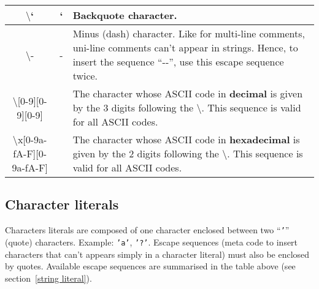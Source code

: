 \begin{tabular}{|c|c|p{7cm}|}
  \hline
  $\setminus$` & `      & Backquote character. \\
  \hline
  $\setminus$\-- & \-- & Minus (dash) character. Like for multi-line
                           comments, uni-line comments can't appear in
                           strings. Hence, to insert the sequence
                           ``\--\--'', use this escape sequence twice. \\
  \hline
  $\setminus$[0-9][0-9][0-9] & & The character whose ASCII code in
                                {\bf decimal} is given by the 3 digits
                                following the $\setminus$. This
                                sequence is valid for all
                                ASCII codes. \\
  \hline
  $\setminus$x[0-9a-fA-F][0-9a-fA-F] & & The character whose ASCII code in
                                {\bf hexadecimal} is given by the 2
                                digits following the $\setminus$. This
                                sequence is valid for all
                                ASCII codes.\\
  \hline
\end{tabular}



\subsection{Character literals}
\label{character literals}
\label{hexadecimal}
Characters literals are composed of one character enclosed between two
``{\tt '}'' (quote) characters. Example: {\tt 'a'}, {\tt '?'}.
Escape sequences (meta code to insert characters that can't appears
simply in a character literal) must also be enclosed by
quotes. Available escape sequences are summarised in the table above
(see section~\ref{string literal}).



